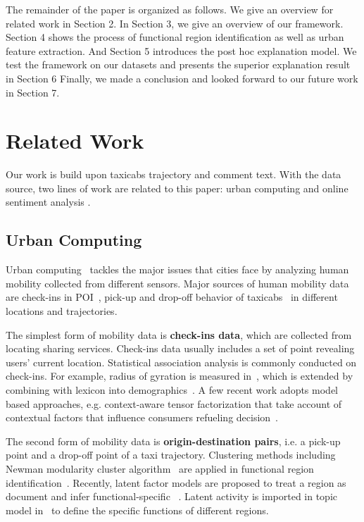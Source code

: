\documentclass[runningheads]{llncs}
\begin{document}
The remainder of the paper is organized as follows.
We give an overview for related work in Section 2.
In Section 3, we give an overview of our framework.
Section 4 shows the process of functional region identification as well as urban feature extraction.
And Section 5 introduces the post hoc explanation model.
We test the framework on our datasets and presents the superior explanation result in Section 6
Finally, we made a conclusion and looked forward to our future work in Section 7.

\section{Related Work}
Our work is build upon taxicabs trajectory and comment text.
With the data source, two lines of work are related to this paper: urban computing and online sentiment analysis .

\subsection{Urban Computing}

Urban computing~\cite{Zheng2014UrbanConcepts} tackles the major issues that cities face by analyzing human mobility collected from different sensors.
Major sources of human mobility data are check-ins in POI~\cite{Gallegos16happier}, pick-up and drop-off behavior of taxicabs~\cite{Ge2011TaxiBusiness,Meng2017Traffic} in different locations and  trajectories.

The simplest form of mobility data is \textbf{check-ins data}, which are collected from locating sharing services. Check-ins data usually includes a set of point revealing users' current location.
Statistical association analysis is commonly conducted on check-ins. For example, radius of gyration is measured in~\cite{Cheng2011Check-in}, which is extended by combining with lexicon into demographics~\cite{Gallegos16happier}.
A few recent work adopts model based approaches, e.g. context-aware tensor factorization that take account of contextual factors that influence consumers refueling decision~\cite{Zhang2015Fuel}.

The second form of mobility data is \textbf{origin-destination pairs}, i.e. a pick-up point and a drop-off point of a taxi trajectory.
Clustering methods including Newman modularity cluster algorithm~\cite{Newman2004ModularityFunction} are applied in functional region identification~\cite{Ratti2010Telecom}.
Recently, latent factor models are proposed to treat a region as document and infer functional-specific ~\cite{Yuan2012FunctionRegion}.%
Latent activity is imported in topic model in~\cite{Yuan2015FunctionRegion} to define the specific functions of different regions.
\end{document}
